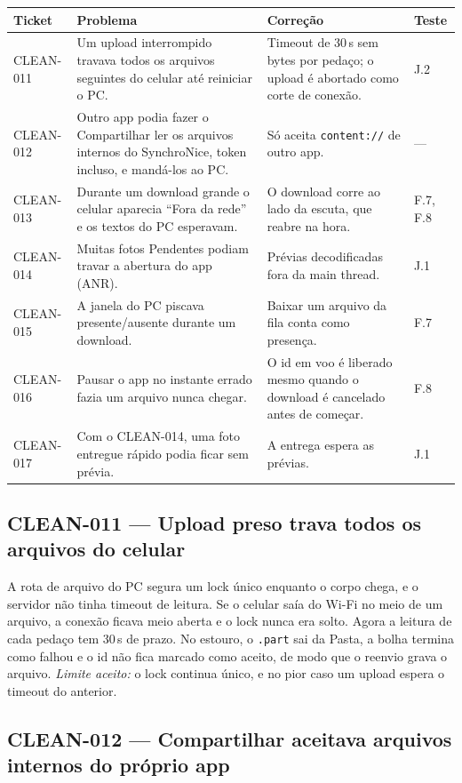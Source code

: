 \documentclass[11pt,a4paper]{article}
\begin{document}
\begin{tabularx}{\linewidth}{@{}l>{\raggedright}X>{\raggedright}X>{\raggedright\arraybackslash}p{1.5cm}@{}}
\toprule
Ticket & Problema & Correção & Teste \\
\midrule
CLEAN-011 & Um upload interrompido travava todos os arquivos seguintes do celular até reiniciar o PC. & Timeout de 30\,s sem bytes por pedaço; o upload é abortado como corte de conexão. & J.2 \\
CLEAN-012 & Outro app podia fazer o Compartilhar ler os arquivos internos do SynchroNice, token incluso, e mandá-los ao PC. & Só aceita \texttt{content://} de outro app. & --- \\
CLEAN-013 & Durante um download grande o celular aparecia ``Fora da rede'' e os textos do PC esperavam. & O download corre ao lado da escuta, que reabre na hora. & F.7, F.8 \\
CLEAN-014 & Muitas fotos Pendentes podiam travar a abertura do app (ANR). & Prévias decodificadas fora da main thread. & J.1 \\
CLEAN-015 & A janela do PC piscava presente/ausente durante um download. & Baixar um arquivo da fila conta como presença. & F.7 \\
CLEAN-016 & Pausar o app no instante errado fazia um arquivo nunca chegar. & O id em voo é liberado mesmo quando o download é cancelado antes de começar. & F.8 \\
CLEAN-017 & Com o CLEAN-014, uma foto entregue rápido podia ficar sem prévia. & A entrega espera as prévias. & J.1 \\
\bottomrule
\end{tabularx}

\subsection*{CLEAN-011 --- Upload preso trava todos os arquivos do celular}

A rota de arquivo do PC segura um lock único enquanto o corpo chega, e o
servidor não tinha timeout de leitura. Se o celular saía do Wi-Fi no meio de
um arquivo, a conexão ficava meio aberta e o lock nunca era solto. Agora a
leitura de cada pedaço tem 30\,s de prazo. No estouro, o \texttt{.part} sai
da Pasta, a bolha termina como falhou e o id não fica marcado como aceito, de
modo que o reenvio grava o arquivo. \emph{Limite aceito:} o lock continua
único, e no pior caso um upload espera o timeout do anterior.

\subsection*{CLEAN-012 --- Compartilhar aceitava arquivos internos do próprio app}
\end{document}
